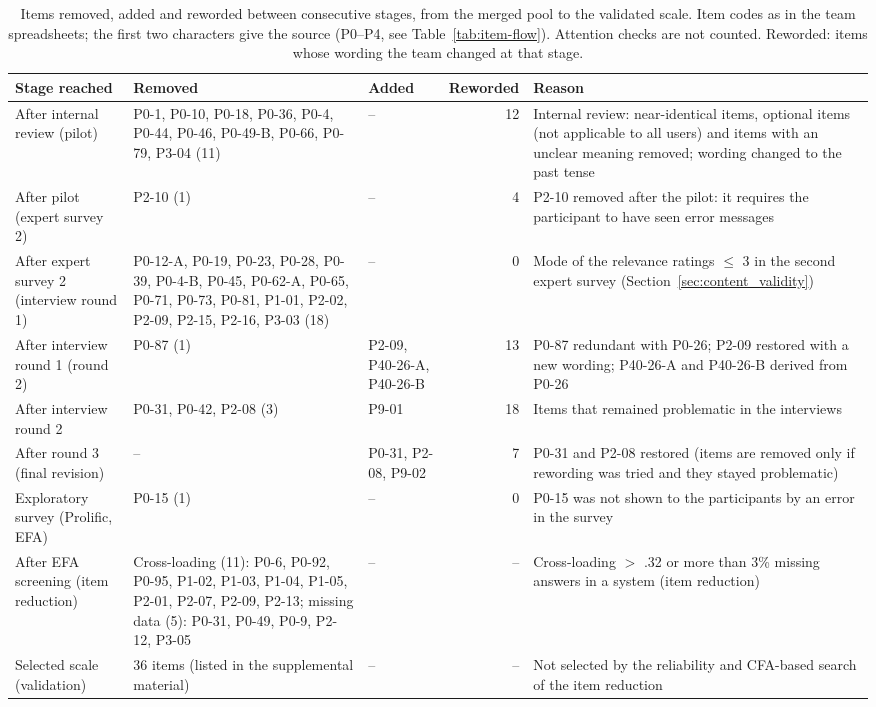 \begin{table}[tbp]
\centering
\caption{Items removed, added and reworded between consecutive stages, from the merged pool to the validated scale. Item codes as in the team spreadsheets; the first two characters give the source (P0--P4, see Table~\ref{tab:item-flow}). Attention checks are not counted. Reworded: items whose wording the team changed at that stage.}
\label{tab:item-flow-changes}
\footnotesize
\begin{tabular}{p{3.3cm}p{5.2cm}p{2.0cm}rp{4.6cm}}
\toprule
Stage reached & Removed & Added & Reworded & Reason \\
\midrule
After internal review (pilot) & P0-1, P0-10, P0-18, P0-36, P0-4, P0-44, P0-46, P0-49-B, P0-66, P0-79, P3-04 (11) & -- & 12 & Internal review: near-identical items, optional items (not applicable to all users) and items with an unclear meaning removed; wording changed to the past tense \\
After pilot (expert survey 2) & P2-10 (1) & -- & 4 & P2-10 removed after the pilot: it requires the participant to have seen error messages \\
After expert survey 2 (interview round 1) & P0-12-A, P0-19, P0-23, P0-28, P0-39, P0-4-B, P0-45, P0-62-A, P0-65, P0-71, P0-73, P0-81, P1-01, P2-02, P2-09, P2-15, P2-16, P3-03 (18) & -- & 0 & Mode of the relevance ratings $\leq$ 3 in the second expert survey (Section~\ref{sec:content_validity}) \\
After interview round 1 (round 2) & P0-87 (1) & P2-09, P40-26-A, P40-26-B & 13 & P0-87 redundant with P0-26; P2-09 restored with a new wording; P40-26-A and P40-26-B derived from P0-26 \\
After interview round 2 & P0-31, P0-42, P2-08 (3) & P9-01 & 18 & Items that remained problematic in the interviews \\
After round 3 (final revision) & -- & P0-31, P2-08, P9-02 & 7 & P0-31 and P2-08 restored (items are removed only if rewording was tried and they stayed problematic) \\
Exploratory survey (Prolific, EFA) & P0-15 (1) & -- & 0 & P0-15 was not shown to the participants by an error in the survey \\
After EFA screening (item reduction) & Cross-loading (11): P0-6, P0-92, P0-95, P1-02, P1-03, P1-04, P1-05, P2-01, P2-07, P2-09, P2-13; missing data (5): P0-31, P0-49, P0-9, P2-12, P3-05 & -- & -- & Cross-loading $>$ .32 or more than 3\% missing answers in a system (item reduction) \\
Selected scale (validation) & 36 items (listed in the supplemental material) & -- & -- & Not selected by the reliability and CFA-based search of the item reduction \\
\bottomrule
\end{tabular}
\end{table}
